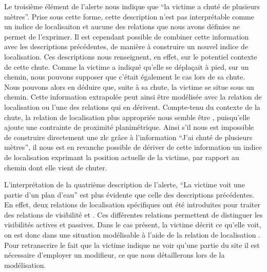 Le troisième élément de l'alerte nous indique que \enquote{la victime
  a chuté de plusieurs mètres}. Prise sous cette forme, cette
description n'est pas interprétable comme un indice de localisaiton et
aucune des relations que nous avons définies ne permet de
l'exprimer. Il est cependant possible de combiner cette information
avec les descriptions précédentes, de manière à construire un nouvel
indice de localisation. Ces descriptions nous renseignent, en effet,
sur le potentiel contexte de cette chute. Comme la victime a indiqué
qu'elle se déplaçait à pied, sur un chemin, nous pouvons supposer que
c'était également le cas lors de sa chute. Nous pouvons alors en
déduire que, suite à sa chute, la victime se situe sous un
chemin. Cette information extrapolée peut ainsi être modélisée avec la
relation de localisation  ou l'une des
relations qui en dérivent. Compte-tenu du contexte de la chute, la
relation de localisation plus appropriée nous semble être
, puisqu’elle ajoute une contrainte de
proximité planimétrique. Ainsi s'il nous est impossible de construire
directement une \ac{zlc} grâce à l'information \enquote{J'ai chuté de
  plusieurs mètres}, il nous est en revanche possible de dériver de
cette information un indice de localisation exprimant la position
actuelle de la victime, par rapport au chemin dont elle vient de
chuter.




L'interprétation de la quatrième description de l'alerte, \enquote{La
  victime voit une partie d'un plan d'eau} est plus évidente que celle
des descriptions précédentes. En effet, deux relations de localisation
spécifiques ont été introduites pour traiter des relations de
visibilité  et
. Ces différentes relations permettent de
distinguer les visibilités actives et passives. Dans le cas présent,
la victime décrit ce qu'elle voit, on est donc dans une situation
modélisable à l'aide de la relation de localisation
.
%
Pour retranscrire le fait que la victime indique ne voir qu'une partie
du site il est nécessaire d'employer un modifieur, ce que nous
détaillerons lors de la modélisation.


